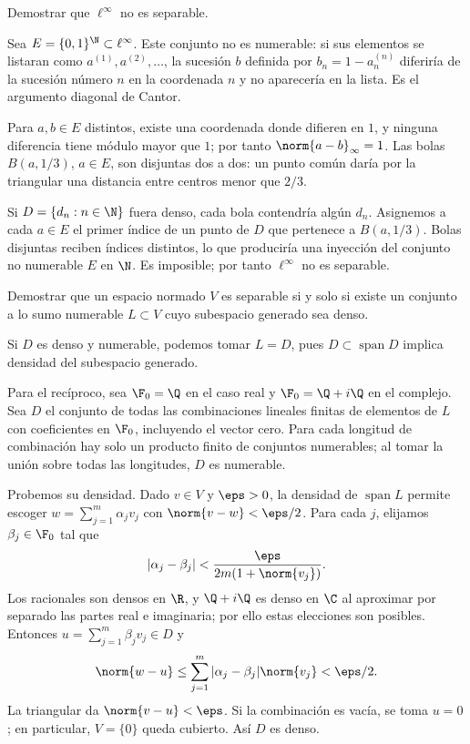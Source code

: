 \begin{ejercicio}\label{ej:lectura-6-1}
Demostrar que $\ell^\infty$ no es separable.
\end{ejercicio}
\begin{solucion}
Sea $E=\{0,1\}^{\N}\subset\ell^\infty$. Este conjunto no es numerable: si sus elementos se listaran como $a^{(1)},a^{(2)},\ldots$, la sucesión $b$ definida por $b_n=1-a^{(n)}_n$ diferiría de la sucesión número $n$ en la coordenada $n$ y no aparecería en la lista. Es el argumento diagonal de Cantor.

Para $a,b\in E$ distintos, existe una coordenada donde difieren en $1$, y ninguna diferencia tiene módulo mayor que $1$; por tanto $\norm{a-b}_\infty=1$. Las bolas $B(a,1/3)$, $a\in E$, son disjuntas dos a dos: un punto común daría por la triangular una distancia entre centros menor que $2/3$.

Si $D=\{d_n:n\in\N\}$ fuera denso, cada bola contendría algún $d_n$. Asignemos a cada $a\in E$ el primer índice de un punto de $D$ que pertenece a $B(a,1/3)$. Bolas disjuntas reciben índices distintos, lo que produciría una inyección del conjunto no numerable $E$ en $\N$. Es imposible; por tanto $\ell^\infty$ no es separable.
\end{solucion}

\begin{ejercicio}\label{ej:lectura-6-2}
Demostrar que un espacio normado $V$ es separable si y solo si existe un conjunto a lo sumo numerable $L\subset V$ cuyo subespacio generado sea denso.
\end{ejercicio}
\begin{solucion}
Si $D$ es denso y numerable, podemos tomar $L=D$, pues $D\subset\operatorname{span}D$ implica densidad del subespacio generado.

Para el recíproco, sea $\F_0=\Q$ en el caso real y $\F_0=\Q+i\Q$ en el complejo. Sea $D$ el conjunto de todas las combinaciones lineales finitas de elementos de $L$ con coeficientes en $\F_0$, incluyendo el vector cero. Para cada longitud de combinación hay solo un producto finito de conjuntos numerables; al tomar la unión sobre todas las longitudes, $D$ es numerable.

Probemos su densidad. Dado $v\in V$ y $\eps>0$, la densidad de $\operatorname{span}L$ permite escoger $w=\sum_{j=1}^m\alpha_jv_j$ con $\norm{v-w}<\eps/2$. Para cada $j$, elijamos $\beta_j\in\F_0$ tal que
\[
|\alpha_j-\beta_j|<\frac{\eps}{2m(1+\norm{v_j})}.
\]
Los racionales son densos en $\R$, y $\Q+i\Q$ es denso en $\C$ al aproximar por separado las partes real e imaginaria; por ello estas elecciones son posibles. Entonces $u=\sum_{j=1}^m\beta_jv_j\in D$ y
\[
\norm{w-u}\le\sum_{j=1}^m|\alpha_j-\beta_j|\norm{v_j}<\eps/2.
\]
La triangular da $\norm{v-u}<\eps$. Si la combinación es vacía, se toma $u=0$; en particular, $V=\{0\}$ queda cubierto. Así $D$ es denso.
\end{solucion}

